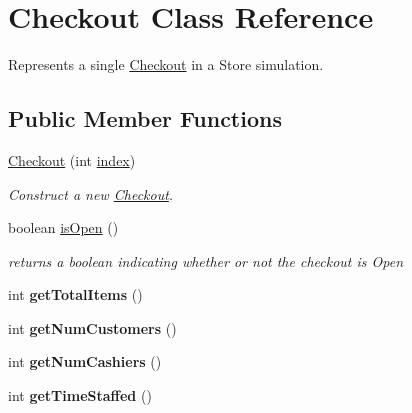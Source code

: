 \hypertarget{class_checkout}{
\section{Checkout Class Reference}
\label{class_checkout}
}
Represents a single \hyperlink{class_checkout}{Checkout} in a Store simulation.  


\subsection*{Public Member Functions}
\begin{CompactItemize}
\item 
\hyperlink{class_checkout_13d3d44f84ba45013d54b5a57c0b1d94}{Checkout} (int \hyperlink{class_checkout_af3a8fb83f2076b69307234d7e8fe7e1}{index})
\begin{CompactList}\small\item\em Construct a new \hyperlink{class_checkout}{Checkout}. \item\end{CompactList}\item 
\hypertarget{class_checkout_f1a2e027703392abec841b38e4b77502}{
boolean \hyperlink{class_checkout_f1a2e027703392abec841b38e4b77502}{isOpen} ()}
\label{class_checkout_f1a2e027703392abec841b38e4b77502}

\begin{CompactList}\small\item\em returns a boolean indicating whether or not the checkout is Open \item\end{CompactList}\item 
\hypertarget{class_checkout_5ea8f962d82f3fa87553df4ccb085be6}{
int \textbf{getTotalItems} ()}
\label{class_checkout_5ea8f962d82f3fa87553df4ccb085be6}

\item 
\hypertarget{class_checkout_8cd0c6c5f213aee6f9d3bc0a8619b861}{
int \textbf{getNumCustomers} ()}
\label{class_checkout_8cd0c6c5f213aee6f9d3bc0a8619b861}

\item 
\hypertarget{class_checkout_93cb8ea2fc194bb6cbd00618ea05c5be}{
int \textbf{getNumCashiers} ()}
\label{class_checkout_93cb8ea2fc194bb6cbd00618ea05c5be}

\item 
\hypertarget{class_checkout_ef8c06214ba64e51382e5f28dcb3d5e4}{
int \textbf{getTimeStaffed} ()}
\label{class_checkout_ef8c06214ba64e51382e5f28dcb3d5e4}


\end{CompactItemize}
